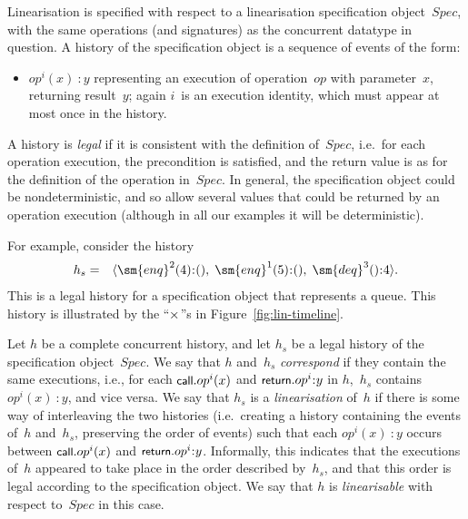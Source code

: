 
Linearisation is specified with respect to a linearisation specification
object~$Spec$, with the same operations (and signatures) as the concurrent
datatype in question.  A history of the specification object is a sequence of
events of the form:
%
\begin{itemize}
\item $op^i(x)\::y$ representing an execution of operation~$op$ with
  parameter~$x$, returning result~$y$; again $i$~is an execution identity,
  which must appear at most once in the history.
\end{itemize}
%
A history is \emph{legal} if it is consistent with the definition of~$Spec$,
i.e.~for each operation execution, the precondition is satisfied, and the
return value is as for the definition of the operation in~$Spec$.  In general,
the specification object could be nondeterministic, and so allow several
values that could be returned by an operation execution (although in all our
examples it will be deterministic).


For example, consider the history
\begin{eqnarray*}
h_s & = & \seq{\sm{enq}^2(4)\::(),\; \sm{enq}^1(5)\::(),\; \sm{deq}^3()\::4}.
\end{eqnarray*}
%
This is a legal history for a specification object that represents a queue.
This history is illustrated by the ``$\times$''s in
Figure~\ref{fig:lin-timeline}.

Let $h$ be a complete concurrent history, and let $h_s$ be a legal history of
the specification object~$Spec$.  We say that $h$ and~$h_s$ \emph{correspond}
if they contain the same executions, i.e., for each $\mbox{\sf{\small call}}.op^i(x)$ and
$\return.op^i\::y$ in $h$,\, $h_s$ contains $op^i(x)\::y$, and vice versa.  We
say that $h_s$ is a \emph{linearisation} of~$h$ if there is some way of
interleaving the two histories (i.e.~creating a history containing the events
of~$h$ and~$h_s$, preserving the order of events) such that each $op^i(x)\::y$
occurs between $\mbox{\sf{\small call}}.op^i(x)$ and $\return.op^i\::y$.  Informally, this
indicates that the executions of~$h$ appeared to take place in the order
described by~$h_s$, and that this order is legal according to the
specification object.  We say that $h$ is \emph{linearisable} with respect
to~$Spec$ in this case.

